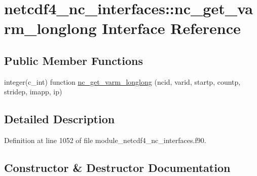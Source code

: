 \hypertarget{interfacenetcdf4__nc__interfaces_1_1nc__get__varm__longlong}{}\section{netcdf4\+\_\+nc\+\_\+interfaces\+:\+:nc\+\_\+get\+\_\+varm\+\_\+longlong Interface Reference}
\label{interfacenetcdf4__nc__interfaces_1_1nc__get__varm__longlong}
\subsection*{Public Member Functions}
\begin{DoxyCompactItemize}
\item 
integer(c\+\_\+int) function \hyperlink{interfacenetcdf4__nc__interfaces_1_1nc__get__varm__longlong_a51f4b53967f9d7b54aa735d54f5ba6ed}{nc\+\_\+get\+\_\+varm\+\_\+longlong} (ncid, varid, startp, countp, stridep, imapp, ip)
\end{DoxyCompactItemize}


\subsection{Detailed Description}


Definition at line 1052 of file module\+\_\+netcdf4\+\_\+nc\+\_\+interfaces.\+f90.



\subsection{Constructor \& Destructor Documentation}
\mbox{\label{interfacenetcdf4__nc__interfaces_1_1nc__get__varm__longlong_a51f4b53967f9d7b54aa735d54f5ba6ed}} 
